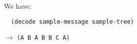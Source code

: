 \documentclass[a4paper,12pt]{article}
\begin{document}
We have:
\begin{lstlisting}
  (decode sample-message sample-tree)
\end{lstlisting}
$\rightarrow$ \lstinline!(A B A B B C A)!
\end{document}
